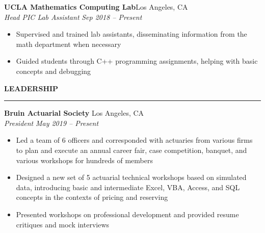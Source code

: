 \documentclass[11pt,letterpaper]{article}
\newcommand{\sectline}{\vspace{4pt}\hrule height 1.5pt\vspace{4pt}}
\newcommand{\sectspace}{\vspace{10pt}}
\newcommand{\smallspace}{\vspace{5pt}}
\begin{document}
\smallspace 
\textbf{UCLA Mathematics Computing Lab}\hfill Los Angeles, CA \\
\textit{Head PIC Lab Assistant} \hfill \textit{Sep 2018 -- Present} \\
\begin{itemize}
	\item Supervised and trained lab assistants, disseminating information from the math department when necessary
	\item Guided students through C++ programming assignments, helping with basic concepts and debugging
\end{itemize}
\sectspace

\textbf{LEADERSHIP} \sectline
\textbf{Bruin Actuarial Society} \hfill Los Angeles, CA \\
\textit{President} \hfill \textit{May 2019 -- Present}
\begin{itemize}
	\item Led a team of 6 officers and corresponded with actuaries from various firms to plan and execute an annual career fair, case competition, banquet, and various workshops for hundreds of members
	
	\item Designed a new set of 5 actuarial technical workshops based on simulated data, introducing basic and intermediate Excel, VBA, Access, and SQL concepts in the contexts of pricing and reserving
	\item Presented workshops on professional development and provided resume critiques and mock interviews

\end{itemize}
\sectspace
\end{document}
